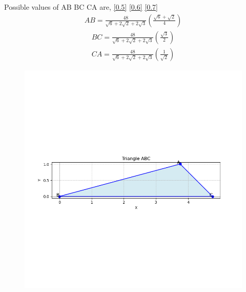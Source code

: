 \documentclass[journal]{IEEEtran}
\begin{document}
Possible values of AB BC CA are, \ref{0.5} \ref{0.6} \ref{0.7}
\begin{align}
    AB = \frac{48}{\sqrt{6}+2\sqrt{2}+2\sqrt{3}}(\frac{\sqrt{6}+\sqrt{2}}{4})
\end{align}
\begin{align}
    BC = \frac{48}{\sqrt{6}+2\sqrt{2}+2\sqrt{3}}(\frac{\sqrt{3}}{2})
\end{align}
\begin{align}
    CA = \frac{48}{\sqrt{6}+2\sqrt{2}+2\sqrt{3}}(\frac{1}{\sqrt{2}})
\end{align}
\begin{figure}[h!]
   \centering
   \includegraphics[width=\linewidth]{figs/Figure_1.png}
   \caption{}
   \label{stemplot}
\end{figure}
\end{document}
